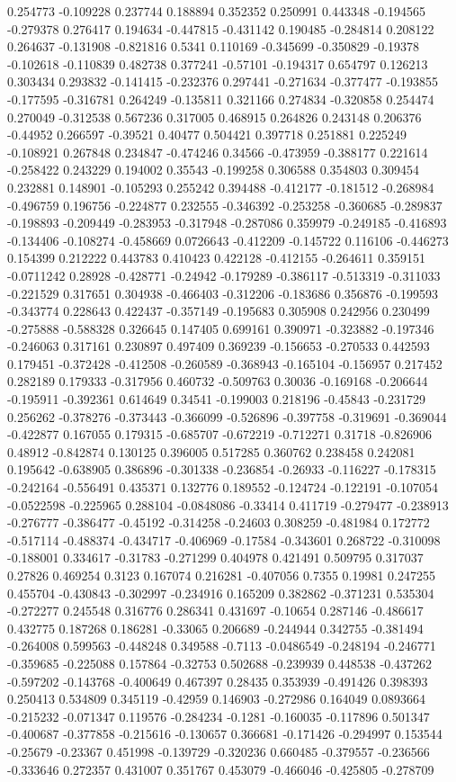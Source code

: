 0.254773 -0.109228 0.237744 0.188894 0.352352 0.250991 0.443348 -0.194565 -0.279378 0.276417 0.194634 -0.447815 -0.431142 0.190485 -0.284814 0.208122 0.264637 -0.131908 -0.821816 0.5341 0.110169 -0.345699 -0.350829 -0.19378 -0.102618 -0.110839 0.482738 0.377241 -0.57101 -0.194317 0.654797 0.126213 0.303434 0.293832 -0.141415 -0.232376 0.297441 -0.271634 -0.377477 -0.193855 -0.177595 -0.316781 0.264249 -0.135811 0.321166 0.274834 -0.320858 0.254474 0.270049 -0.312538 0.567236 0.317005 0.468915 0.264826 0.243148 0.206376 -0.44952 0.266597 -0.39521 0.40477 0.504421 0.397718 0.251881 0.225249 -0.108921 0.267848 0.234847 -0.474246 0.34566 -0.473959 -0.388177 0.221614 -0.258422 0.243229 0.194002 0.35543 -0.199258 0.306588 0.354803 0.309454 0.232881 0.148901 -0.105293 0.255242 0.394488 -0.412177 -0.181512 -0.268984 -0.496759 0.196756 -0.224877 0.232555 -0.346392 -0.253258 -0.360685 -0.289837 -0.198893 -0.209449 -0.283953 -0.317948 -0.287086 0.359979 -0.249185 -0.416893 -0.134406 -0.108274 -0.458669 0.0726643 -0.412209 -0.145722 0.116106 -0.446273 0.154399 0.212222 0.443783 0.410423 0.422128 -0.412155 -0.264611 0.359151 -0.0711242 0.28928 -0.428771 -0.24942 -0.179289 -0.386117 -0.513319 -0.311033 -0.221529 0.317651 0.304938 -0.466403 -0.312206 -0.183686 0.356876 -0.199593 -0.343774 0.228643 0.422437 -0.357149 -0.195683 0.305908 0.242956 0.230499 -0.275888 -0.588328 0.326645 0.147405 0.699161 0.390971 -0.323882 -0.197346 -0.246063 0.317161 0.230897 0.497409 0.369239 -0.156653 -0.270533 0.442593 0.179451 -0.372428 -0.412508 -0.260589 -0.368943 -0.165104 -0.156957 0.217452 0.282189 0.179333 -0.317956 0.460732 -0.509763 0.30036 -0.169168 -0.206644 -0.195911 -0.392361 0.614649 0.34541 -0.199003 0.218196 -0.45843 -0.231729 0.256262 -0.378276 -0.373443 -0.366099 -0.526896 -0.397758 -0.319691 -0.369044 -0.422877 0.167055 0.179315 -0.685707 -0.672219 -0.712271 0.31718 -0.826906 0.48912 -0.842874 0.130125 0.396005 0.517285 0.360762 0.238458 0.242081 0.195642 -0.638905 0.386896 -0.301338 -0.236854 -0.26933 -0.116227 -0.178315 -0.242164 -0.556491 0.435371 0.132776 0.189552 -0.124724 -0.122191 -0.107054 -0.0522598 -0.225965 0.288104 -0.0848086 -0.33414 0.411719 -0.279477 -0.238913 -0.276777 -0.386477 -0.45192 -0.314258 -0.24603 0.308259 -0.481984 0.172772 -0.517114 -0.488374 -0.434717 -0.406969 -0.17584 -0.343601 0.268722 -0.310098 -0.188001 0.334617 -0.31783 -0.271299 0.404978 0.421491 0.509795 0.317037 0.27826 0.469254 0.3123 0.167074 0.216281 -0.407056 0.7355 0.19981 0.247255 0.455704 -0.430843 -0.302997 -0.234916 0.165209 0.382862 -0.371231 0.535304 -0.272277 0.245548 0.316776 0.286341 0.431697 -0.10654 0.287146 -0.486617 0.432775 0.187268 0.186281 -0.33065 0.206689 -0.244944 0.342755 -0.381494 -0.264008 0.599563 -0.448248 0.349588 -0.7113 -0.0486549 -0.248194 -0.246771 -0.359685 -0.225088 0.157864 -0.32753 0.502688 -0.239939 0.448538 -0.437262 -0.597202 -0.143768 -0.400649 0.467397 0.28435 0.353939 -0.491426 0.398393 0.250413 0.534809 0.345119 -0.42959 0.146903 -0.272986 0.164049 0.0893664 -0.215232 -0.071347 0.119576 -0.284234 -0.1281 -0.160035 -0.117896 0.501347 -0.400687 -0.377858 -0.215616 -0.130657 0.366681 -0.171426 -0.294997 0.153544 -0.25679 -0.23367 0.451998 -0.139729 -0.320236 0.660485 -0.379557 -0.236566 -0.333646 0.272357 0.431007 0.351767 0.453079 -0.466046 -0.425805 -0.278709 